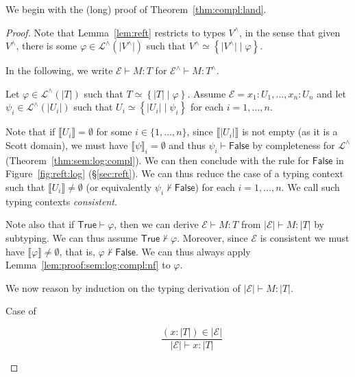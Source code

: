 \documentclass[%
  a4paper,
  UKenglish,
  cleveref,
  autoref,
  thm-restate,
  numberwithinsect,
]{lipics-v2021}
\newcommand\thesis{\vdash}
\newcommand\I[1]{\llbracket #1 \rrbracket} %
\newcommand\temp[1]{\mathsf{#1}}
\newcommand\True{\temp{True}}
\newcommand\False{\temp{False}}
\newcommand\Env{\mathcal{E}}    %
\newcommand\eqtype\simeq
\newcommand\reft[1]{\left\{ #1 \right\}}
\newcommand\RT{T}               %
\newcommand\RTbis{U}            %
\newcommand\RTter{V}            %
\newcommand\UPT[1]{\vert #1 \vert}        %
\newcommand\Lang{\mathcal{L}}
\begin{document}
We begin with the (long) proof of Theorem~\ref{thm:compl:land}.


\ThmComplLand*


\begin{proof}
Note that Lemma~\ref{lem:reft} 
restricts to types $\RTter^\land$, in the sense that given $\RTter^\land$,
there is some $\varphi \in \Lang^\land(\UPT{\RTter^\land})$
such that $\RTter^\land \eqtype \reft{\UPT{\RTter^\land} \mid \varphi}$.

In the following, we write $\Env \thesis M \colon \RT$
for $\Env^\land \thesis M \colon \RT^\land$.

Let $\varphi \in \Lang^\land(\UPT\RT)$ such that
$\RT \eqtype \reft{\UPT\RT \mid \varphi}$.
Assume
$\Env = x_1\colon \RTbis_1,\dots,x_n \colon \RTbis_n$
and
let $\psi_i \in \Lang^\land(\UPT{\RTbis_i})$
such that
$\RTbis_i \eqtype \reft{\UPT{\RTbis_i} \mid \psi_i}$
for each $i = 1,\dots,n$.

Note that if
$\I{\RTbis_i} = \emptyset$ for some $i \in \{1,\dots,n\}$,
since $\I{\UPT{\RTbis_i}}$ is not empty (as it is a Scott domain),
we must have $\I\psi_i = \emptyset$
and thus $\psi_i \thesis \False$ by
completeness for $\Lang^\land$
(Theorem~\ref{thm:sem:log:compl}).
We can then conclude with the rule for $\False$ in Figure~\ref{fig:reft:log}
(\S\ref{sec:reft}).
%
We can thus reduce the case of a typing context
such that 
$\I{\RTbis_i} \neq \emptyset$
(or equivalently $\psi_i \not\thesis \False$)
for each $i = 1,\dots,n$.
We call such typing contexts \emph{consistent}.

Note also that if $\True \thesis \varphi$,
then we can derive $\Env \thesis M \colon \RT$
from $\UPT\Env \thesis M \colon \UPT\RT$ by subtyping.
We can thus assume $\True \not\thesis \varphi$.
%
Moreover, since $\Env$ is consistent we must have $\I\varphi \neq \emptyset$,
that is, $\varphi \not\thesis \False$.
We can thus always apply Lemma~\ref{lem:proof:sem:log:compl:nf} to $\varphi$.

We now reason by induction on the typing derivation of
$\UPT\Env \thesis M \colon \UPT\RT$.
\begin{description}
\item[Case of]
\[
\dfrac{(x\colon\UPT\RT) \in \UPT\Env}
  {\UPT\Env \thesis x\colon\UPT\RT}
\]


\end{description}
\end{proof}
\end{document}
